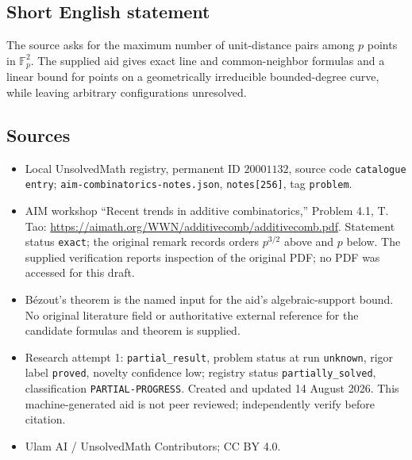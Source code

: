 \documentclass[11pt]{article}
\newcommand{\F}{\mathbb{F}}
\begin{document}
\subsection{Short English statement}
The source asks for the maximum number of unit-distance pairs among \(p\) points in \(\F_p^2\). The supplied aid gives exact line and common-neighbor formulas and a linear bound for points on a geometrically irreducible bounded-degree curve, while leaving arbitrary configurations unresolved.
\subsection{Sources}
\begin{itemize}
\item Local UnsolvedMath registry, permanent ID \(20001132\), source code \texttt{catalogue entry}; \texttt{aim-combinatorics-notes.json}, \texttt{notes[256]}, tag \texttt{problem}.
\item AIM workshop ``Recent trends in additive combinatorics,'' Problem 4.1, T. Tao: \url{https://aimath.org/WWN/additivecomb/additivecomb.pdf}. Statement status \texttt{exact}; the original remark records orders \(p^{3/2}\) above and \(p\) below. The supplied verification reports inspection of the original PDF; no PDF was accessed for this draft.
\item B\'ezout's theorem is the named input for the aid's algebraic-support bound. No original literature field or authoritative external reference for the candidate formulas and theorem is supplied.
\item Research attempt 1: \texttt{partial\_result}, problem status at run \texttt{unknown}, rigor label \texttt{proved}, novelty confidence low; registry status \texttt{partially\_solved}, classification \texttt{PARTIAL-PROGRESS}. Created and updated 14 August 2026. This machine-generated aid is not peer reviewed; independently verify before citation.
\item Ulam AI / UnsolvedMath Contributors; CC BY 4.0.
\end{itemize}
\end{document}
